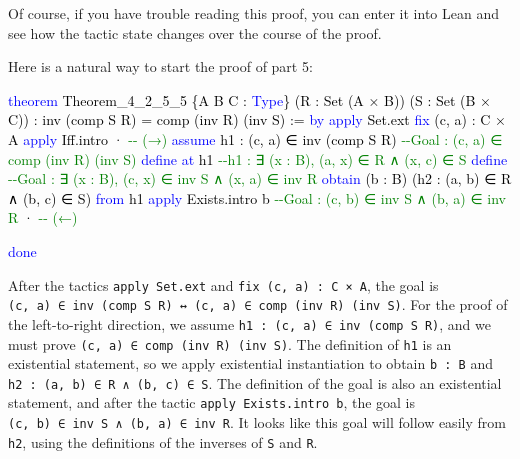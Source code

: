 \documentclass[
  letterpaper,
  DIV=11,
  numbers=noendperiod]{scrreprt}
\makeatletter
\newenvironment{Shaded}{\begin{snugshade}}{\end{snugshade}}
\newcommand{\CommentTok}[1]{\textcolor[rgb]{0.37,0.37,0.37}{#1}}
\newcommand{\KeywordTok}[1]{\textcolor[rgb]{0.00,0.23,0.31}{#1}}
\newcommand{\NormalTok}[1]{\textcolor[rgb]{0.00,0.23,0.31}{#1}}
\newcommand{\SpecialCharTok}[1]{\textcolor[rgb]{0.37,0.37,0.37}{#1}}
\newcommand{\WarningTok}[1]{\textcolor[rgb]{0.37,0.37,0.37}{\textit{#1}}}
\def\redsquiggly{\bgroup \markoverwith{\textcolor{red}{\lower3.5\p@\hbox{\sixly \char58}}}\ULon}
\renewcommand{\NormalTok}[1]{\textcolor[HTML]{000000}{#1}}
\renewcommand{\KeywordTok}[1]{\textcolor[HTML]{0000FF}{#1}}
\renewcommand{\SpecialCharTok}[1]{}
\renewcommand{\WarningTok}[1]{\redsquiggly{\textcolor[HTML]{0000FF}{#1}}}
\renewcommand{\CommentTok}[1]{\textcolor[HTML]{008000}{#1}}
\theoremstyle{remark}
\makeatother
\begin{document}
Of course, if you have trouble reading this proof, you can enter it into
Lean and see how the tactic state changes over the course of the proof.

Here is a natural way to start the proof of part 5:

\begin{Shaded}
\begin{Highlighting}[]
\KeywordTok{theorem}\NormalTok{ Theorem\_4\_2\_5\_5 \{A B C : }\KeywordTok{Type}\NormalTok{\}}
\NormalTok{    (R : Set (A × B)) (S : Set (B × C)) :}
\NormalTok{    inv (comp S R) = comp (inv R) (inv S) := }\KeywordTok{by}
  \KeywordTok{apply}\NormalTok{ Set.ext}
  \KeywordTok{fix}\NormalTok{ (c, a) : C × A}
  \KeywordTok{apply}\NormalTok{ Iff.intro}
\NormalTok{  · }\CommentTok{{-}{-} (→)}
    \KeywordTok{assume}\NormalTok{ h1 : (c, a) ∈ inv (comp S R)}
                      \CommentTok{{-}{-}Goal : (c, a) ∈ comp (inv R) (inv S)}
    \KeywordTok{define} \KeywordTok{at}\NormalTok{ h1      }\CommentTok{{-}{-}h1 : ∃ (x : B), (a, x) ∈ R ∧ (x, c) ∈ S}
    \KeywordTok{define}            \CommentTok{{-}{-}Goal : ∃ (x : B), (c, x) ∈ inv S ∧ (x, a) ∈ inv R}
    \KeywordTok{obtain}\NormalTok{ (b : B) (h2 : (a, b) ∈ R ∧ (b, c) ∈ S) }\KeywordTok{from}\NormalTok{ h1}
    \KeywordTok{apply}\NormalTok{ Exists.intro b         }\CommentTok{{-}{-}Goal : (c, b) ∈ inv S ∧ (b, a) ∈ inv R}
    \SpecialCharTok{**}\WarningTok{done}\SpecialCharTok{::}
\NormalTok{  · }\CommentTok{{-}{-} (←)}

    \SpecialCharTok{**}\WarningTok{done}\SpecialCharTok{::}
  \KeywordTok{done}
\end{Highlighting}
\end{Shaded}

After the tactics \texttt{apply\ Set.ext} and
\texttt{fix\ (c,\ a)\ :\ C\ ×\ A}, the goal is
\texttt{(c,\ a)\ ∈\ inv\ (comp\ S\ R)\ ↔\ (c,\ a)\ ∈\ comp\ (inv\ R)\ (inv\ S)}.
For the proof of the left-to-right direction, we assume
\texttt{h1\ :\ (c,\ a)\ ∈\ inv\ (comp\ S\ R)}, and we must prove
\texttt{(c,\ a)\ ∈\ comp\ (inv\ R)\ (inv\ S)}. The definition of
\texttt{h1} is an existential statement, so we apply existential
instantiation to obtain \texttt{b\ :\ B} and
\texttt{h2\ :\ (a,\ b)\ ∈\ R\ ∧\ (b,\ c)\ ∈\ S}. The definition of the
goal is also an existential statement, and after the tactic
\texttt{apply\ Exists.intro\ b}, the goal is
\texttt{(c,\ b)\ ∈\ inv\ S\ ∧\ (b,\ a)\ ∈\ inv\ R}. It looks like this
goal will follow easily from \texttt{h2}, using the definitions of the
inverses of \texttt{S} and \texttt{R}.
\end{document}
